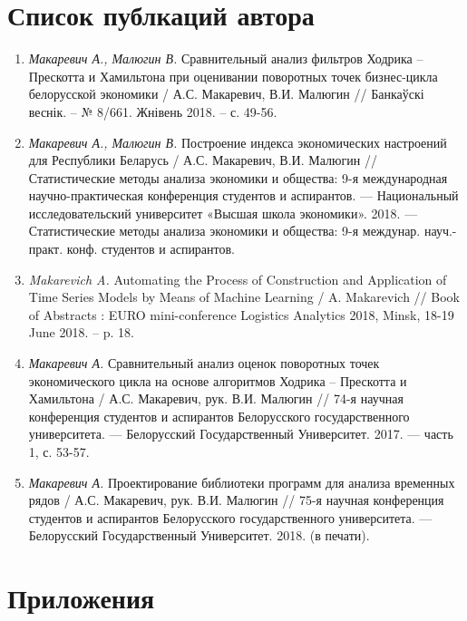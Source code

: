 \documentclass[a4paper,14pt]{extreport}
\begin{document}
	\chapter*{Список публкаций автора}
	\begin{enumerate}[label=A\arabic*.]
		\item \textit{Макаревич А., Малюгин В.} Сравнительный анализ фильтров Ходрика – Прескотта и Хамильтона при оценивании поворотных точек бизнес-цикла белорусской экономики / А.С. Макаревич, В.И. Малюгин // Банкаўскі веснік. – № 8/661. Жнівень 2018. – с. 49-56.
		
		\item \textit{Макаревич А., Малюгин В.} Построение индекса экономических настроений для Республики Беларусь / А.С. Макаревич, В.И. Малюгин // Статистические методы анализа экономики и общества: 9-я международная научно-практическая конференция студентов и аспирантов. — Национальный исследовательский университет «Высшая школа экономики». 2018. — Статистические методы анализа экономики и общества: 9-я междунар. науч.-практ. конф. студентов и аспирантов.
		
		\item \textit{Makarevich A.} Automating the Process of Construction and Application of Time Series Models by Means of Machine Learning / A. Makarevich // Book of Abstracts : EURO mini-conference Logistics Analytics 2018, Minsk, 18-19 June 2018. – p. 18.
		
		\item \textit{Макаревич А.} Сравнительный анализ оценок поворотных точек экономического цикла на основе алгоритмов Ходрика – Прескотта и Хамильтона / А.С. Макаревич, рук. В.И. Малюгин // 74-я научная конференция студентов и аспирантов Белорусского государственного университета. — Белорусский Государственный Университет. 2017. — часть 1, с. 53-57.
		
		\item \textit{Макаревич А.} Проектирование библиотеки программ для анализа временных рядов / А.С. Макаревич, рук. В.И. Малюгин // 75-я научная конференция студентов и аспирантов Белорусского государственного университета. — Белорусский Государственный Университет. 2018. (в печати).
	\end{enumerate}
	
	
	\chapter*{Приложения}
	
\end{document}
